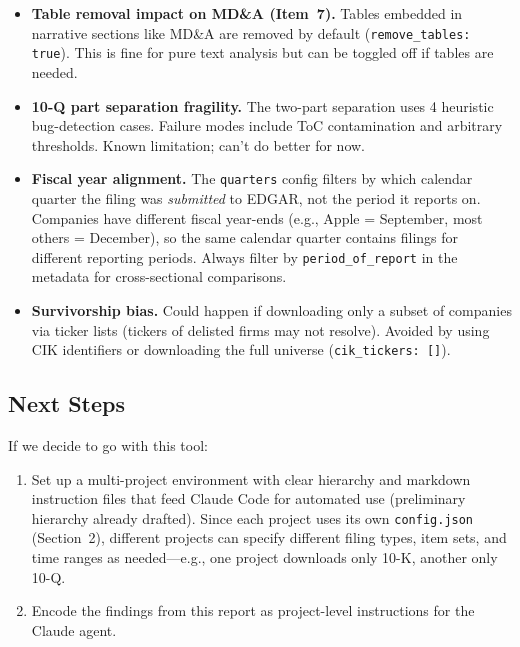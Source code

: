 \documentclass[11pt]{article}
\begin{document}
\begin{itemize}
  \item \textbf{Table removal impact on MD\&A (Item~7).}
    Tables embedded in narrative sections like MD\&A are removed by default
    (\texttt{remove\_tables: true}). This is fine for pure text analysis but can
    be toggled off if tables are needed.

  \item \textbf{10-Q part separation fragility.}
    The two-part separation uses 4 heuristic bug-detection cases. Failure modes
    include ToC contamination and arbitrary thresholds. Known limitation; can't
    do better for now.

  \item \textbf{Fiscal year alignment.}
    The \texttt{quarters} config filters by which calendar quarter the filing was
    \emph{submitted} to EDGAR, not the period it reports on. Companies have
    different fiscal year-ends (e.g., Apple = September, most others = December),
    so the same calendar quarter contains filings for different reporting periods.
    Always filter by \texttt{period\_of\_report} in the metadata for
    cross-sectional comparisons.

  \item \textbf{Survivorship bias.}
    Could happen if downloading only a subset of companies via ticker lists
    (tickers of delisted firms may not resolve). Avoided by using CIK identifiers
    or downloading the full universe (\texttt{cik\_tickers: []}).
\end{itemize}

\subsection{Next Steps}

If we decide to go with this tool:
\begin{enumerate}
  \item Set up a multi-project environment with clear hierarchy and markdown
    instruction files that feed Claude Code for automated use (preliminary
    hierarchy already drafted). Since each project uses its own
    \texttt{config.json} (Section~2), different projects can specify different
    filing types, item sets, and time ranges as needed---e.g., one project
    downloads only 10-K, another only 10-Q.
  \item Encode the findings from this report as project-level instructions for
    the Claude agent.
\end{enumerate}
\end{document}
